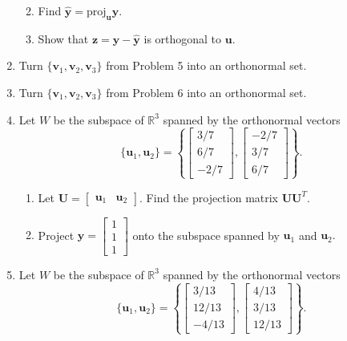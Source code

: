 \documentclass[
]{book}
\providecommand{\tightlist}{%
  \setlength{\itemsep}{0pt}\setlength{\parskip}{0pt}}
\theoremstyle{definition}
\theoremstyle{definition}
\theoremstyle{definition}
\theoremstyle{definition}
\theoremstyle{remark}
\begin{document}
\begin{enumerate}
  \begin{enumerate}
  \def\labelenumii{\alph{enumii}.}
  \tightlist
  \item
    Find \(\hat{\mathbf{y}}=\text{proj}_\mathbf{u}\mathbf{y}.\)
  \item
    Show that \(\mathbf{z}=\mathbf{y}-\hat{\mathbf{y}}\) is orthogonal to \(\mathbf{u}.\)
  \end{enumerate}
\item
  Turn \(\{\mathbf{v}_1,\mathbf{v}_2,\mathbf{v}_3\}\) from Problem 5 into an orthonormal set.
\item
  Turn \(\{\mathbf{v}_1,\mathbf{v}_2,\mathbf{v}_3\}\) from Problem 6 into an orthonormal set.
\item
  Let \(W\) be the subspace of \(\mathbb{R}^3\) spanned by the orthonormal vectors
  \[\{\mathbf{u}_1,\mathbf{u}_2\}=\left\{\begin{bmatrix}3/7\\6/7\\-2/7\end{bmatrix},\begin{bmatrix}-2/7\\3/7\\6/7\end{bmatrix}\right\}.\]

  \begin{enumerate}
  \def\labelenumii{\alph{enumii}.}
  \tightlist
  \item
    Let \(\mathbf{U}=\begin{bmatrix} \mathbf{u}_1 & \mathbf{u}_2\end{bmatrix}.\) Find the projection matrix \(\mathbf{U}\mathbf{U}^T.\)
  \item
    Project \(\mathbf{y}=\begin{bmatrix}1\\1\\1\end{bmatrix}\) onto the subspace spanned by \(\mathbf{u}_1\) and \(\mathbf{u}_2.\)
  \end{enumerate}
\item
  Let \(W\) be the subspace of \(\mathbb{R}^3\) spanned by the orthonormal vectors
  \[\{\mathbf{u}_1,\mathbf{u}_2\}=\left\{\begin{bmatrix}3/13\\12/13\\-4/13\end{bmatrix},\begin{bmatrix}4/13\\3/13\\12/13\end{bmatrix}\right\}.\]


\end{enumerate}
\end{document}
